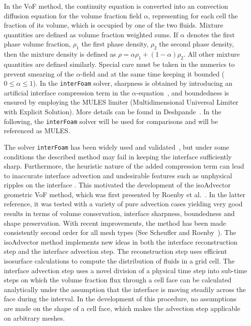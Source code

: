 \documentclass[review]{elsarticle}
\begin{document}
In the VoF method, the continuity equation is converted into an convection diffusion equation for the volume fraction field $\alpha$, representing for each cell the fraction of its volume, which is occupied by one of the two fluids. Mixture quantities are defined as volume fraction weighted sums. If $\alpha$ denotes the first phase volume fraction, $\rho_1$ the first phase density, $\rho_2$ the second phase density, then the mixture density is defined as $\rho = \alpha\rho_1 + (1-\alpha)\rho_2$. All other mixture quantities are defined similarly. 
Special care must be taken in the numerics to prevent smearing of the $\alpha$-field and at the same time keeping it bounded ($0\leq \alpha\leq 1$). In the \verb+interFoam+ solver, sharpness is obtained by introducing an artificial interface compression term in the $\alpha$-equation~\cite{Weller2008}, and boundedness is ensured by employing the MULES limiter (Multidimensional Universal Limiter with Explicit Solution). More details can be found in Deshpande~\cite{Deshpande2012}. In the following, the  \verb+interFoam+ solver will be used for comparisons and will be referenced as MULES.

The solver \verb+interFoam+ has been widely used and validated~\cite{MARSCHALL2012,RAEINI2012,HOANG2013,BILGER2017}, but under some conditions the described method may fail in keeping the interface sufficiently sharp. Furthermore, the heuristic nature of the added compression term can lead to inaccurate interface advection and undesirable features such as unphysical ripples on the interface \cite{roenby_new_2017,roenby_isoadvector:_2018}. This motivated the development of the isoAdvector geometric VoF method, which was first presented by Roenby et al.~\cite{Roenby160405}. In the latter reference, it was tested with a variety of pure advection cases yielding very good results in terms of volume conservation, interface sharpness, boundedness and shape preservation. 
With recent improvements, the method has been made consistently second order for all mesh types (See Scheufler and Roenby~\cite{Scheufler2018}). The isoAdvector method implements new ideas in both the interface reconstruction step and the interface advection step.
The reconstruction step uses efficient isosurface calculations to compute the distribution
of fluids in a grid cell. The interface advection step uses a novel division of
a physical time step into sub-time steps on which the volume fraction flux through a 
cell face can be calculated analytically under the assumption that the interface is moving 
steadily across the face during the interval. In the development of this procedure, 
no assumptions are made on the shape of a cell face, which makes the advection step 
applicable on arbitrary meshes.
\end{document}
